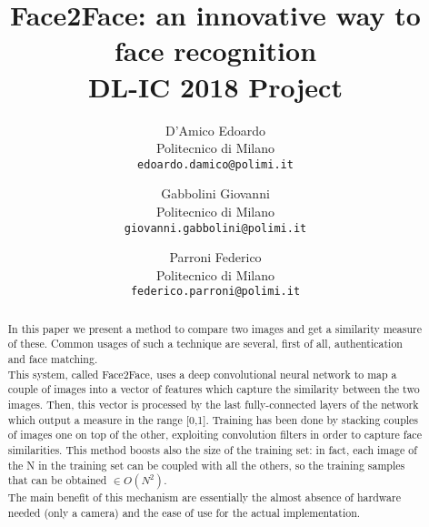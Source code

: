\documentclass[10pt,twocolumn,letterpaper]{article}
\begin{document}
\title{Face2Face: an innovative way to face recognition \\ DL-IC 2018 Project} 

\author{D'Amico Edoardo\\
Politecnico di Milano\\
{\tt\small edoardo.damico@polimi.it}
\and
Gabbolini Giovanni\\
Politecnico di Milano\\
{\tt\small giovanni.gabbolini@polimi.it}
\and
Parroni Federico\\
Politecnico di Milano\\
{\tt\small federico.parroni@polimi.it}
}

\maketitle

\begin{abstract}
In this paper we present a method to compare two images and get a similarity measure of these. Common usages of such a technique are several, first of all, authentication and face matching.
\\
This system, called Face2Face, uses a deep convolutional neural network to map a couple of images into a vector of features which capture the similarity between the two images. Then, this vector is processed by the last fully-connected layers of the network which output a measure in the range [0,1]. Training has been done by stacking couples of images one on top of the other, exploiting convolution filters in order to capture face similarities. This method boosts also the size of the training set: in fact, each image of the N in the training set can be coupled with all the others, so the training samples that can be obtained $\in O(N^2)$.
\\
The main benefit of this mechanism are essentially the almost absence of hardware needed (only a camera) and the ease of use for the actual implementation. 
\end{abstract}

\end{document}
